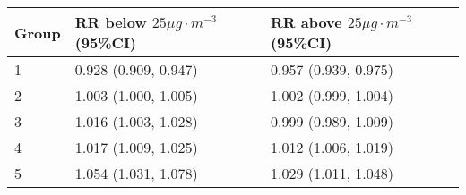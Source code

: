 \begin{tabular}{lll}
  \hline
Group & RR below $25 \mu g \cdot m^{-3}$ (95\%CI) & RR above $25 \mu g \cdot m^{-3}$ (95\%CI) \\ 
  \hline
   1 & 0.928 (0.909, 0.947) & 0.957 (0.939, 0.975) \\ 
     2 & 1.003 (1.000, 1.005) & 1.002 (0.999, 1.004) \\ 
     3 & 1.016 (1.003, 1.028) & 0.999 (0.989, 1.009) \\ 
     4 & 1.017 (1.009, 1.025) & 1.012 (1.006, 1.019) \\ 
     5 & 1.054 (1.031, 1.078) & 1.029 (1.011, 1.048) \\ 
   \hline
\end{tabular}


